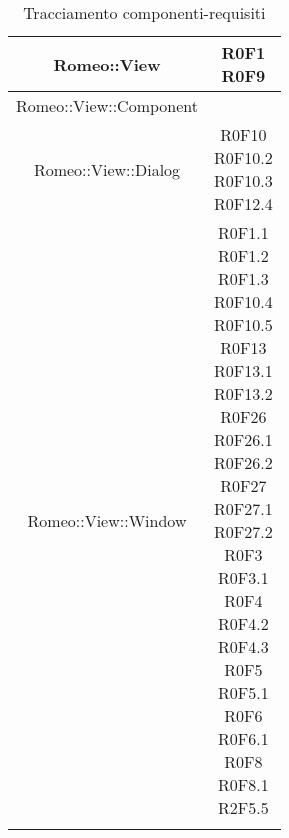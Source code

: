 \begin{center}
\begin{longtable}{|c|c|}
\hline
\parbox[t]{\larghezza}{Romeo::View}   & \parbox[t]{\larghezza}{ R0F1 \\ R0F9 \\} \\
\hline
\parbox[t]{\larghezza}{Romeo::View::Component}   & \parbox[t]{\larghezza}{} \\
\hline
\parbox[t]{\larghezza}{Romeo::View::Dialog}   & \parbox[t]{\larghezza}{ R0F10 \\ R0F10.2 \\ R0F10.3 \\ R0F12.4 \\} \\
\hline
\parbox[t]{\larghezza}{Romeo::View::Window}   & \parbox[t]{\larghezza}{ R0F1.1 \\ R0F1.2 \\ R0F1.3 \\ R0F10.4  \\ R0F10.5  \\ R0F13 \\ R0F13.1 \\ R0F13.2 \\ R0F26 \\ R0F26.1 \\ R0F26.2 \\ R0F27 \\ R0F27.1 \\ R0F27.2 \\ R0F3 \\ R0F3.1 \\ R0F4 \\ R0F4.2 \\ R0F4.3 \\ R0F5 \\ R0F5.1 \\ R0F6 \\ R0F6.1 \\ R0F8 \\ R0F8.1  \\ R2F5.5 \\} \\
\hline
\caption{Tracciamento componenti-requisiti}
    \end{longtable}
\end{center}
